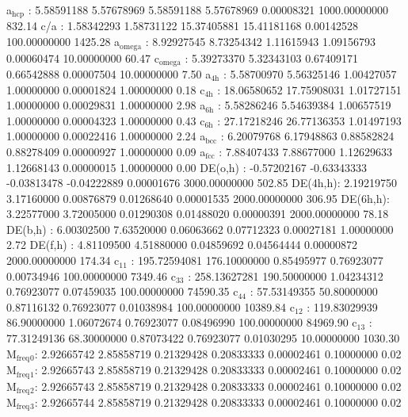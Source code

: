 \documentclass[11pt]{article}
\begin{document}
a\(_{\text{hcp}}\)   :   5.58591188   5.57678969   5.58591188   5.57678969   0.00008321 1000.00000000       832.14
c/a     :   1.58342293   1.58731122  15.37405881  15.41181168   0.00142528 100.00000000      1425.28
a\(_{\text{omega}}\) :   8.92927545   8.73254342   1.11615943   1.09156793   0.00060474  10.00000000        60.47
c\(_{\text{omega}}\) :   5.39273370   5.32343103   0.67409171   0.66542888   0.00007504  10.00000000         7.50
a\(_{\text{4h}}\)    :   5.58700970   5.56325146   1.00427057   1.00000000   0.00001824   1.00000000         0.18
c\(_{\text{4h}}\)    :  18.06580652  17.75908031   1.01727151   1.00000000   0.00029831   1.00000000         2.98
a\(_{\text{6h}}\)    :   5.58286246   5.54639384   1.00657519   1.00000000   0.00004323   1.00000000         0.43
c\(_{\text{6h}}\)    :  27.17218246  26.77136353   1.01497193   1.00000000   0.00022416   1.00000000         2.24
a\(_{\text{bcc}}\)   :   6.20079768   6.17948863   0.88582824   0.88278409   0.00000927   1.00000000         0.09
a\(_{\text{fcc}}\)   :   7.88407433   7.88677000   1.12629633   1.12668143   0.00000015   1.00000000         0.00
DE(o,h) :  -0.57202167  -0.63343333  -0.03813478  -0.04222889   0.00001676 3000.00000000       502.85
DE(4h,h):   2.19219750   3.17160000   0.00876879   0.01268640   0.00001535 2000.00000000       306.95
DE(6h,h):   3.22577000   3.72005000   0.01290308   0.01488020   0.00000391 2000.00000000        78.18
DE(b,h) :   6.00302500   7.63520000   0.06063662   0.07712323   0.00027181   1.00000000         2.72
DE(f,h) :   4.81109500   4.51880000   0.04859692   0.04564444   0.00000872 2000.00000000       174.34
c\(_{\text{11}}\)    : 195.72594081 176.10000000   0.85495977   0.76923077   0.00734946 100.00000000      7349.46
c\(_{\text{33}}\)    : 258.13627281 190.50000000   1.04234312   0.76923077   0.07459035 100.00000000     74590.35
c\(_{\text{44}}\)    :  57.53149355  50.80000000   0.87116132   0.76923077   0.01038984 100.00000000     10389.84
c\(_{\text{12}}\)    : 119.83029939  86.90000000   1.06072674   0.76923077   0.08496990 100.00000000     84969.90
c\(_{\text{13}}\)    :  77.31249136  68.30000000   0.87073422   0.76923077   0.01030295  10.00000000      1030.30
M\(_{\text{freq}}\)\(_{\text{0}}\):   2.92665742   2.85858719   0.21329428   0.20833333   0.00002461   0.10000000         0.02
M\(_{\text{freq}}\)\(_{\text{1}}\):   2.92665743   2.85858719   0.21329428   0.20833333   0.00002461   0.10000000         0.02
M\(_{\text{freq}}\)\(_{\text{2}}\):   2.92665743   2.85858719   0.21329428   0.20833333   0.00002461   0.10000000         0.02
M\(_{\text{freq}}\)\(_{\text{3}}\):   2.92665744   2.85858719   0.21329428   0.20833333   0.00002461   0.10000000         0.02
\end{document}
